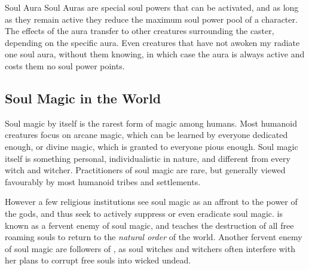 \begin{35e}{Soul Aura}
  Soul Auras are special soul powers that can be activated, and as long as
  they remain active they reduce the maximum soul power pool of a
  character. The effects of the aura transfer to other creatures surrounding
  the caster, depending on the specific aura. Even creatures that have not
  awoken my radiate one soul aura, without them knowing, in which case the
  aura is always active and costs them no soul power points.
\end{35e}

\subsection{Soul Magic in the World}
\label{sec:Soul Magic in the World}

Soul magic by itself is the rarest form of magic among humans. Most humanoid
creatures focus on arcane magic, which can be learned by everyone dedicated
enough, or divine magic, which is granted to everyone pious enough. Soul magic
itself is something personal, individualistic in nature, and different from
every witch and witcher. Practitioners of soul magic are rare, but generally
viewed favourably by most humanoid tribes and settlements.

However a few religious institutions see soul magic as an affront to the power
of the gods, and thus seek to actively suppress or even eradicate soul magic.
 is known as a fervent enemy of soul magic, and teaches the
destruction of all free roaming souls to return to the \emph{natural order} of
the world. Another fervent enemy of soul magic are followers of
, as soul witches and witchers often interfere with her
plans to corrupt free souls into wicked undead.
